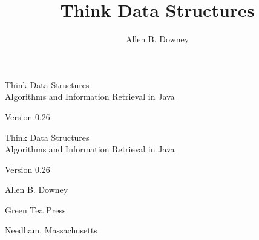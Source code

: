 \documentclass[12pt]{book}
\title{Think Data Structures}
\author{Allen B. Downey}
\newcommand{\thetitle}{Think Data Structures}
\newcommand{\thesubtitle}{Algorithms and Information Retrieval in Java}
\newcommand{\theauthors}{Allen B. Downey}
\newcommand{\theversion}{0.26}
\theoremstyle{exercise}
\newif\ifplastex
\begin{document}
\frontmatter

\ifplastex

\maketitle

\else

\begin{latexonly}

\thispagestyle{empty}

\begin{flushright}
\vspace*{2.0in}

\begin{spacing}{3}
{\huge \thetitle} \\
{\Large \thesubtitle}
\end{spacing}

\vspace{0.25in}

Version \theversion

\vfill
\end{flushright}

\newpage
\thispagestyle{empty}

\quad

\newpage
\thispagestyle{empty}

\begin{flushright}
\vspace*{2.0in}

\begin{spacing}{3}
{\huge \thetitle} \\
{\Large \thesubtitle}
\end{spacing}

\vspace{0.25in}

Version \theversion

\vspace{1in}

{\Large \theauthors}

\vspace{0.5in}

{\Large Green Tea Press}

{\small Needham, Massachusetts}

\vfill
\end{flushright}


\end{latexonly}
\end{document}
